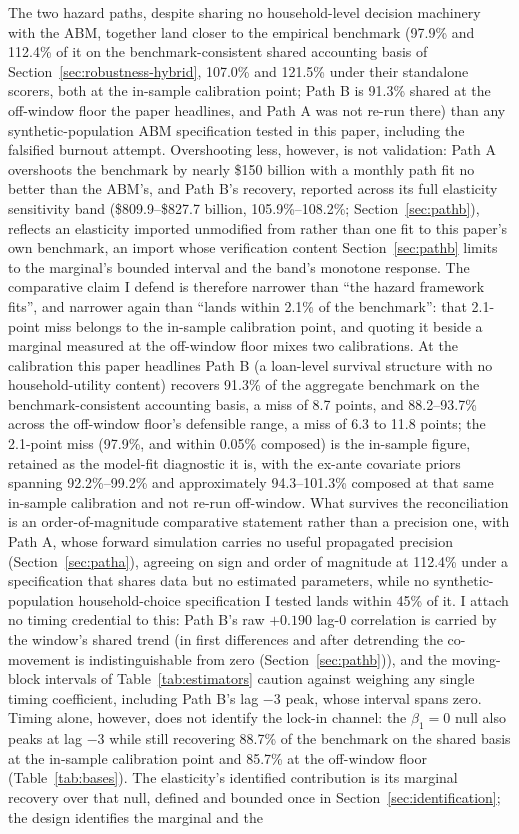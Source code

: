\documentclass[12pt]{article}
\begin{document}
The two hazard paths, despite sharing no household-level decision machinery with the ABM, together land closer to the empirical benchmark (97.9\% and 112.4\% of it on the benchmark-consistent shared accounting basis of Section~\ref{sec:robustness-hybrid}, 107.0\% and 121.5\% under their standalone scorers, both at the in-sample calibration point; Path B is 91.3\% shared at the off-window floor the paper headlines, and Path A was not re-run there) than any synthetic-population ABM specification tested in this paper, including the falsified burnout attempt. Overshooting less, however, is not validation: Path A overshoots the benchmark by nearly \$150 billion with a monthly path fit no better than the ABM's, and Path B's recovery, reported across its full elasticity sensitivity band (\$809.9--\$827.7 billion, 105.9\%--108.2\%; Section~\ref{sec:pathb}), reflects an elasticity imported unmodified from \citet{liebersohn2024} rather than one fit to this paper's own benchmark, an import whose verification content Section~\ref{sec:pathb} limits to the marginal's bounded interval and the band's monotone response. The comparative claim I defend is therefore narrower than ``the hazard framework fits'', and narrower again than ``lands within 2.1\% of the benchmark'': that 2.1-point miss belongs to the in-sample calibration point, and quoting it beside a marginal measured at the off-window floor mixes two calibrations. At the calibration this paper headlines Path B (a loan-level survival structure with no household-utility content) recovers 91.3\% of the aggregate benchmark on the benchmark-consistent accounting basis, a miss of 8.7 points, and 88.2--93.7\% across the off-window floor's defensible range, a miss of 6.3 to 11.8 points; the 2.1-point miss (97.9\%, and within 0.05\% composed) is the in-sample figure, retained as the model-fit diagnostic it is, with the ex-ante covariate priors spanning 92.2\%--99.2\% and approximately 94.3--101.3\% composed at that same in-sample calibration and not re-run off-window. What survives the reconciliation is an order-of-magnitude comparative statement rather than a precision one, with Path A, whose forward simulation carries no useful propagated precision (Section~\ref{sec:patha}), agreeing on sign and order of magnitude at 112.4\% under a specification that shares data but no estimated parameters, while no synthetic-population household-choice specification I tested lands within 45\% of it. I attach no timing credential to this: Path B's raw $+0.190$ lag-0 correlation is carried by the window's shared trend (in first differences and after detrending the co-movement is indistinguishable from zero (Section~\ref{sec:pathb})), and the moving-block intervals of Table~\ref{tab:estimators} caution against weighing any single timing coefficient, including Path B's lag $-3$ peak, whose interval spans zero. Timing alone, however, does not identify the lock-in channel: the $\beta_1 = 0$ null also peaks at lag $-3$ while still recovering 88.7\% of the benchmark on the shared basis at the in-sample calibration point and 85.7\% at the off-window floor (Table~\ref{tab:bases}). The elasticity's identified contribution is its marginal recovery over that null, defined and bounded once in Section~\ref{sec:identification}; the design identifies the marginal and the 
\end{document}
